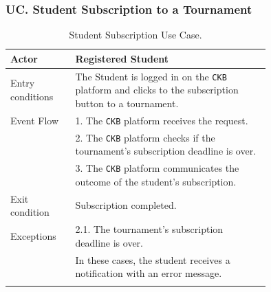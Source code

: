 \subsubsection*{UC\cuc . Student Subscription to a Tournament}
\begin{center}
    \begin{longtable}{lp{0.75\linewidth}}
        \hline
        Actor            & Registered Student                                                                                                                                                                               \\
        \hline
        Entry conditions & The Student is logged in on the \verb|CKB| platform and clicks to the subscription button to a tournament.                                                                                                            \\
        \hline
        Event Flow       
        & 1. The \verb|CKB| platform receives the request.\\
        & 2. The \verb|CKB| platform checks if the tournament's subscription deadline is over.\\
        & 3. The \verb|CKB| platform communicates the outcome of the student's subscription.\\
        \hline
        Exit condition   & Subscription completed.   \\                                                                                                                                                                           
        \hline
        Exceptions   
        & 2.1. The tournament's subscription deadline is over.\\                                                                                                                                              
            & In these cases, the student receives a notification with an error message.   \\                                                               
        \hline
        \caption{Student Subscription Use Case.}
        \label{tab: student_subscription_use_case}
    \end{longtable}

\end{center}

